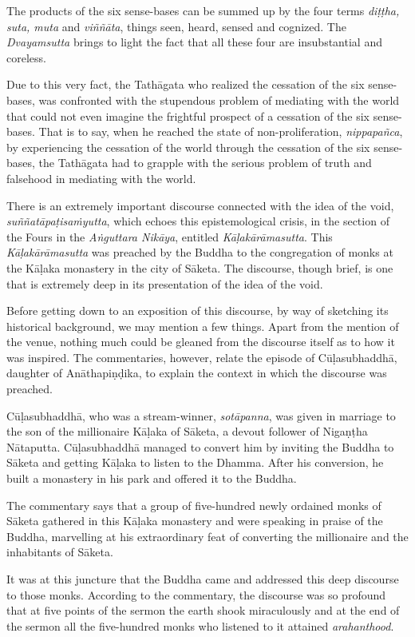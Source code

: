 The products of the six sense-bases can be summed up by the four terms \emph{diṭṭha, suta, muta} and \emph{viññāta}, things seen, heard, sensed and cognized. The \emph{Dvayamsutta} brings to light the fact that all these four are insubstantial and coreless.

Due to this very fact, the Tathāgata who realized the cessation of the six sense-bases, was confronted with the stupendous problem of mediating with the world that could not even imagine the frightful prospect of a cessation of the six sense-bases. That is to say, when he reached the state of non-proliferation, \emph{nippapañca}, by experiencing the cessation of the world through the cessation of the six sense-bases, the Tathāgata had to grapple with the serious problem of truth and falsehood in mediating with the world.

There is an extremely important discourse connected with the idea of the void, \emph{suññatāpaṭisaṁyutta}, which echoes this epistemological crisis, in the section of the Fours in the \emph{Aṅguttara Nikāya}, entitled \emph{Kāḷakārāmasutta}. This \emph{Kāḷakārāmasutta} was preached by the Buddha to the congregation of monks at the Kāḷaka monastery in the city of Sāketa. The discourse, though brief, is one that is extremely deep in its presentation of the idea of the void.

Before getting down to an exposition of this discourse, by way of sketching its historical background, we may mention a few things. Apart from the mention of the venue, nothing much could be gleaned from the discourse itself as to how it was inspired. The commentaries, however, relate the episode of Cūḷasubhaddhā, daughter of Anāthapiṇḍika, to explain the context in which the discourse was preached.

Cūḷasubhaddhā, who was a stream-winner, \emph{sotāpanna}, was given in marriage to the son of the millionaire Kāḷaka of Sāketa, a devout follower of Nigaṇṭha Nātaputta. Cūḷasubhaddhā managed to convert him by inviting the Buddha to Sāketa and getting Kāḷaka to listen to the Dhamma. After his conversion, he built a monastery in his park and offered it to the Buddha.

The commentary says that a group of five-hundred newly ordained monks of Sāketa gathered in this Kāḷaka monastery and were speaking in praise of the Buddha, marvelling at his extraordinary feat of converting the millionaire and the inhabitants of Sāketa.

It was at this juncture that the Buddha came and addressed this deep discourse to those monks. According to the commentary, the discourse was so profound that at five points of the sermon the earth shook miraculously and at the end of the sermon all the five-hundred monks who listened to it attained \emph{arahanthood}.

